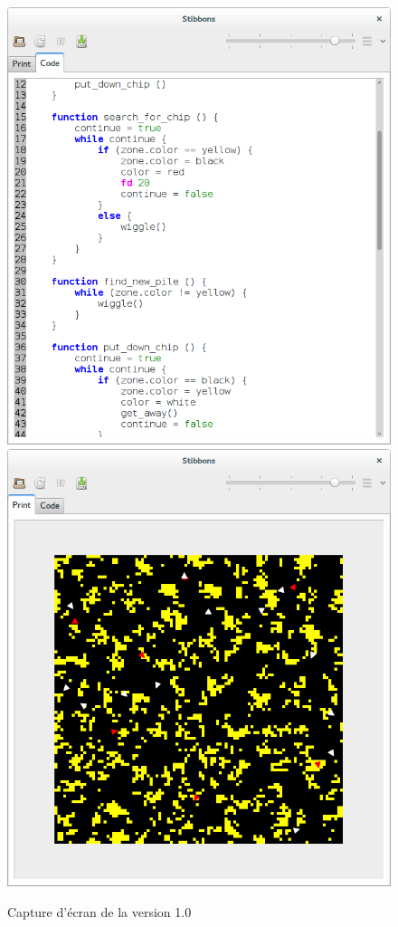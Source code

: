 \begin{figure}[h]
\centering
\includegraphics[scale=0.25]{doc/report/screenshot/stibbons-0-5-2.png}
\includegraphics[scale=0.25]{doc/report/screenshot/stibbons-0-5-3.png}
\caption{\label{screenshot-1.0} Capture d'écran de la version 1.0}
\end{figure}

